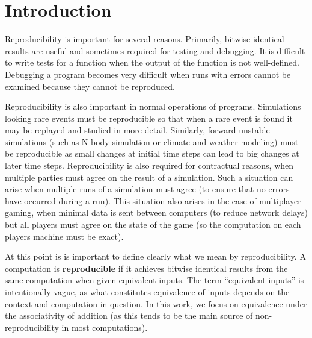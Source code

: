 \section{Introduction}
  Reproducibility is important for several reasons. Primarily, bitwise identical results are useful and sometimes required for testing and debugging. It is difficult to write tests for a function when the output of the function is not well-defined. Debugging a program becomes very difficult when runs with errors cannot be examined because they cannot be reproduced.

  Reproducibility is also important in normal operations of programs. Simulations looking rare events must be reproducible so that when a rare event is found it may be replayed and studied in more detail. Similarly, forward unstable simulations (such as N-body simulation or climate and weather modeling) must be reproducible as small changes at initial time steps can lead to big changes at later time steps. Reproducibility is also required for contractual reasons, when multiple parties must agree on the result of a simulation. Such a situation can arise when multiple runs of a simulation must agree (to ensure that no errors have occurred during a run). This situation also arises in the case of multiplayer gaming, when minimal data is sent between computers (to reduce network delays) but all players must agree on the state of the game (so the computation on each players machine must be exact).

  At this point is is important to define clearly what we mean by reproducibility. A computation is \textbf{reproducible} if it achieves bitwise identical results from the same computation when given equivalent inputs. The term ``equivalent inputs'' is intentionally vague, as what constitutes equivalence of inputs depends on the context and computation in question. In this work, we focus on equivalence under the associativity of addition (as this tends to be the main source of non-reproducibility in most computations). 

